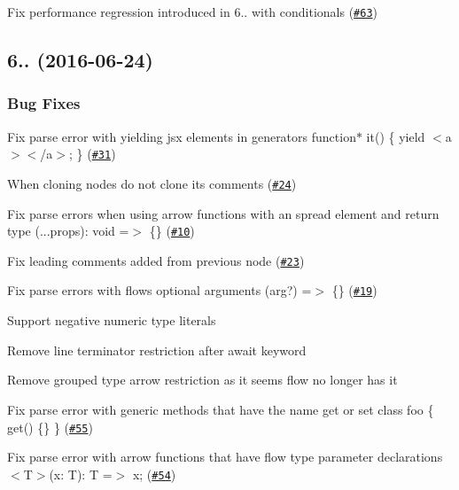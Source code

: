 \begin{DoxyItemize}
\item Fix performance regression introduced in 6.. with conditionals (\href{https://github.com/babel/babylon/pull/63}{\tt \#63}) 
\end{DoxyItemize}

\subsection*{6.. (2016-\/06-\/24)}

\subsubsection*{Bug Fixes}


\begin{DoxyItemize}
\item Fix parse error with yielding jsx elements in generators {\ttfamily function$\ast$ it() \{ yield $<$a$>$$<$/a$>$; \}} (\href{https://github.com/babel/babylon/pull/31}{\tt \#31}) 
\item When cloning nodes do not clone its comments (\href{https://github.com/babel/babylon/pull/24}{\tt \#24}) 
\item Fix parse errors when using arrow functions with an spread element and return type {\ttfamily (...props)\+: void =$>$ \{\}} (\href{https://github.com/babel/babylon/pull/10}{\tt \#10}) 
\item Fix leading comments added from previous node (\href{https://github.com/babel/babylon/pull/23}{\tt \#23}) 
\item Fix parse errors with flow\textquotesingle{}s optional arguments {\ttfamily (arg?) =$>$ \{\}} (\href{https://github.com/babel/babylon/pull/19}{\tt \#19}) 
\item Support negative numeric type literals 
\item Remove line terminator restriction after await keyword 
\item Remove grouped type arrow restriction as it seems flow no longer has it 
\item Fix parse error with generic methods that have the name {\ttfamily get} or {\ttfamily set} {\ttfamily class foo \{ get() \{\} \}} (\href{https://github.com/babel/babylon/pull/55}{\tt \#55}) 
\item Fix parse error with arrow functions that have flow type parameter declarations {\ttfamily $<$T$>$(x\+: T)\+: T =$>$ x;} (\href{https://github.com/babel/babylon/pull/54}{\tt \#54}) 
\end{DoxyItemize}

